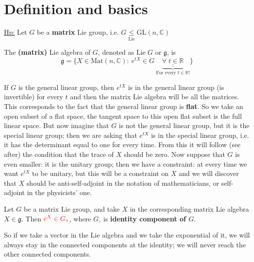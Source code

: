 \documentclass[../main.tex]{subfiles}
\begin{document}
\section{Definition and basics}
\underline{Hp:} Let $G$ be a \textbf{matrix} Lie group, i.e. $G\underset{\textrm{Lie}}{\leq}\textrm{GL}(n,\mathbb{C})$
\begin{definition}The \textbf{(matrix)} Lie algebra of $G$, denoted as $\textrm{Lie}\;G$ or $\mathfrak{g}$, is
\[
\mathfrak{g}=\big\{X\in\textrm{Mat}(n,\mathbb{C}):\ e^{tX}\in G \ \underbrace{\underline{\underline{\forall\;t\in\mathbb{R}}}}_{\textrm{For every $t\in\mathbb{R}$!}}\big\}
\]
\end{definition}
If $G$ is the general linear group, then $e^{tX}$ is in the general linear group (is invertible) for every $t$ and then the matrix Lie algebra will be all the matrices. This corresponds to the fact that the general linear group is \textbf{flat}. So we take an open subset of a flat space, the tangent space to this open flat subset is the full linear space. But now imagine that $G$ is not the general linear group, but it is the special linear group; then we are asking that $e^{tX}$ is in the special linear group, i.e. it has the determinant equal to one for every time. From this it will follow (see after) the condition that the trace of $X$ should be zero. Now suppose that $G$ is even smaller: it is the unitary group; then we have a constraint: at every time we want $e^{tX}$ to be unitary, but this will be a constraint on $X$ and we will discover that $X$ should be anti-self-adjoint in the notation of mathematicians, or self-adjoint in the physicists' one.
\begin{proposition}
Let $G$ be a matrix Lie group, and take $X$ in the corresponding matrix Lie algebra $X\in\mathfrak{g}$. Then ${\color{red}e^X\in G_\circ}$, where $G_\circ$ is \textbf{identity component of $G$}.
\end{proposition}
So if we take a vector in the Lie algebra and we take the exponential of it, we will always stay in the connected components at the identity; we will never reach the other connected components.
\end{document}
